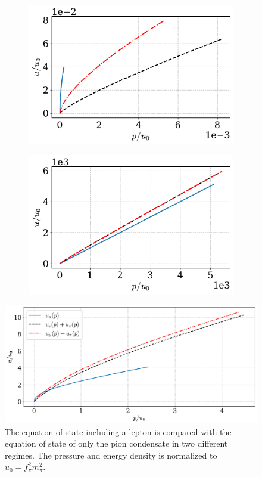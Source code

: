 \begin{figure}[h]
    \centering
    \begin{subfigure}{0.49\textwidth}
        \includegraphics[width=\textwidth]{../scripts/figurer/charge_neutrality/eos_nr.pdf}
    \end{subfigure}
    \begin{subfigure}{0.49\textwidth}
        \includegraphics[width=\textwidth]{../scripts/figurer/charge_neutrality/eos_ur.pdf}
    \end{subfigure}
    \includegraphics[width=\textwidth]{../scripts/figurer/charge_neutrality/eos_I.pdf}
    \caption{
        The equation of state including a lepton is compared with the equation of state of only the pion condensate in two different regimes.
        The pressure and energy density is normalized to $u_0 = f_\pi^2 m_\pi^2$.
    }
    \label{fig: eos with leptons}
\end{figure}

